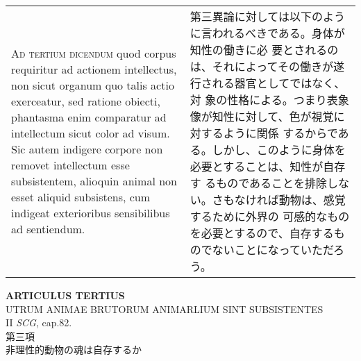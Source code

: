 \documentclass[10pt]{jsarticle} %
\begin{document}
\begin{longtable}{p{21em}p{21em}}
\\



{\scshape Ad tertium dicendum} quod corpus requiritur ad actionem
intellectus, non sicut organum quo talis actio exerceatur, sed ratione
obiecti, phantasma enim comparatur ad intellectum sicut color ad
visum. Sic autem indigere corpore non removet intellectum esse
subsistentem, alioquin animal non esset aliquid subsistens, cum
indigeat exterioribus sensibilibus ad sentiendum.


&

第三異論に対しては以下のように言われるべきである。身体が知性の働きに必
要とされるのは、それによってその働きが遂行される器官としてではなく、対
象の性格による。つまり表象像が知性に対して、色が視覚に対するように関係
するからである。しかし、このように身体を必要とすることは、知性が自存す
るものであることを排除しない。さもなければ動物は、感覚するために外界の
可感的なものを必要とするので、自存するものでないことになっていただろう。

\\


\end{longtable}
\newpage







\begin{center}
{\Large {\bf ARTICULUS TERTIUS}}\\
{\large UTRUM ANIMAE BRUTORUM ANIMARLIUM SINT SUBSISTENTES}\\
{\footnotesize II {\itshape SCG}, cap.82.}\\
{\Large 第三項\\非理性的動物の魂は自存するか}
\end{center}
\end{document}
